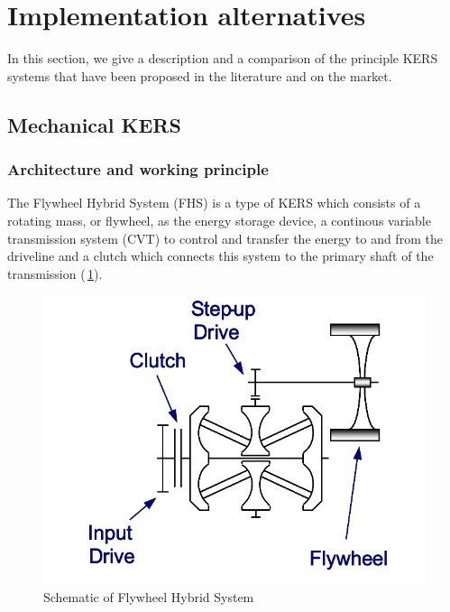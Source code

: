\documentclass[11pt]{article}
\begin{document}
\section{Implementation alternatives}

In this section, we give a description and a comparison of the principle KERS systems that have been proposed in the literature and on the market.

\subsection{Mechanical KERS}

\subsubsection{Architecture and working principle}

The Flywheel Hybrid System (FHS) is a type of KERS which consists of a rotating mass, or flywheel, as the energy storage device, a continous variable transmission system (CVT) to control and transfer the energy to and from the driveline and a clutch which connects this system to the primary shaft of the transmission (\figurename\,\ref{fig: FHS}). 

\begin{figure}[H]
\centering
\includegraphics[width=.6\textwidth]{Images/Mechanical_KERS.png}
\caption{Schematic of Flywheel Hybrid System}
\label{fig: FHS}
\end{figure}
\end{document}

